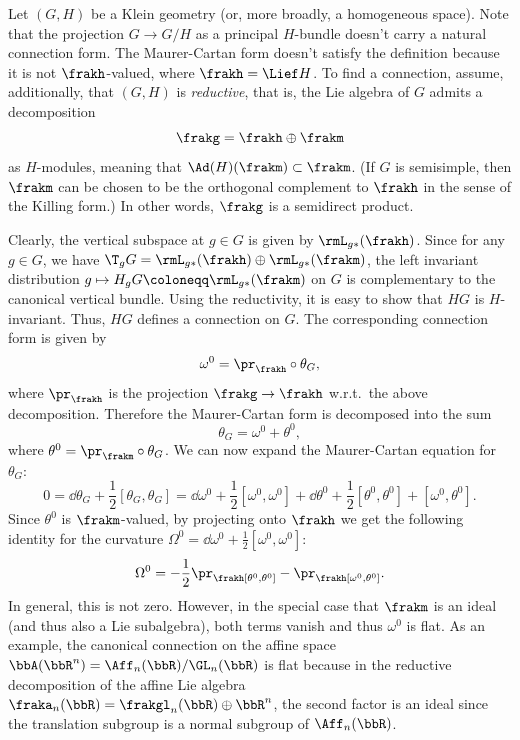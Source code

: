\begin{example}\label{ex 1.3.19 RS2}
    Let $(G,H)$ be a Klein geometry (or, more broadly, a homogeneous space). Note that the projection $G\to G\slash H$ as a principal $H$-bundle doesn't carry a natural connection form. The Maurer-Cartan form doesn't satisfy the definition because it is not $\frakh$-valued, where $\frakh=\Lief H$. To find a connection, assume, additionally, that $(G,H)$ is \emph{reductive}, that is, the Lie algebra of $G$ admits a decomposition
    \[\frakg=\frakh\oplus\frakm\]
    as $H$-modules, meaning that $\Ad(H)(\frakm)\subset \frakm$. (If $G$ is semisimple, then $\frakm$ can be chosen to be the orthogonal complement to $\frakh$ in the sense of the Killing form.) In other words, $\frakg$ is a semidirect product.

    Clearly, the vertical subspace at $g\in G$ is given by $\rmL_{g\ast}(\frakh)$. Since for any $g\in G$, we have $\T_gG=\rmL_{g\ast}(\frakh)\oplus \rmL_{g\ast}(\frakm)$, the left invariant distribution $g\mapsto H_gG\coloneqq \rmL_{g\ast}(\frakm)$ on $G$ is complementary to the canonical vertical bundle. Using the reductivity, it is easy to show that $HG$ is $H$-invariant. Thus, $HG$ defines a connection on $G$. The corresponding connection form is given by
    \[\omega^0=\pr_\frakh\circ \theta_G,\]
    where $\pr_\frakh$ is the projection $\frakg\to \frakh$ w.r.t.\ the above decomposition. Therefore the Maurer-Cartan form is decomposed into the sum
    \[\theta_G=\omega^0+\theta^0,\]
    where $\theta^0=\pr_{\frakm}\circ\theta_G$. We can now expand the Maurer-Cartan equation for $\theta_G$:
    \[0=\dd \theta_G+\frac12[\theta_G,\theta_G]=\dd \omega^0+\frac12[\omega^0,\omega^0]+\dd \theta^0+\frac12[\theta^0,\theta^0]+[\omega^0,\theta^0].\]
    Since $\theta^0$ is $\frakm$-valued, by projecting onto $\frakh$ we get the following identity for the curvature $\Omega^0=\dd\omega^0+\frac12[\omega^0,\omega^0]$:
    \[\Omega^0=-\frac12\pr_\frakh[\theta^0,\theta^0]-\pr_\frakh[\omega^0,\theta^0].\]
    In general, this is not zero. However, in the special case that $\frakm$ is an ideal (and thus also a Lie subalgebra), both terms vanish and thus $\omega^0$ is flat. As an example, the canonical connection on the affine space $\bbA(\bbR^n)=\Aff_n(\bbR)\slash \GL_n(\bbR)$ is flat because in the reductive decomposition of the affine Lie algebra $\fraka_n(\bbR)=\frakgl_n(\bbR)\oplus \bbR^n$, the second factor is an ideal since the translation subgroup is a normal subgroup of $\Aff_n(\bbR)$.
\end{example}

